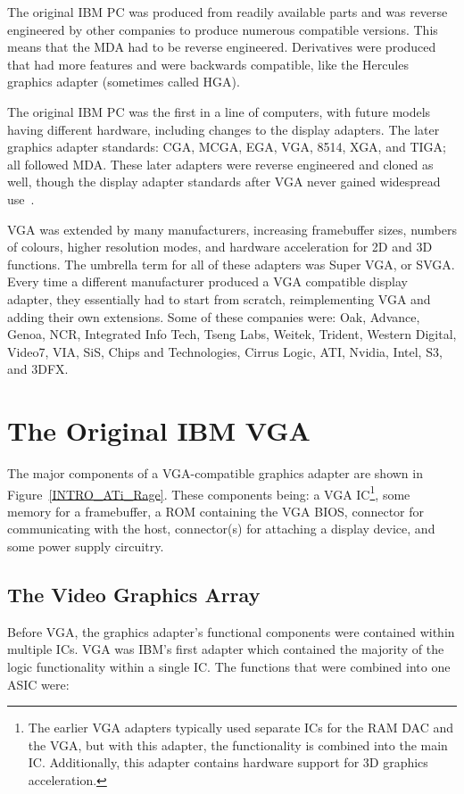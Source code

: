 The original IBM PC was produced from readily available parts and was reverse
engineered by other companies to produce numerous compatible versions. This means
that the MDA had to be reverse engineered. Derivatives were produced that had
more features and were backwards compatible, like the Hercules graphics adapter
(sometimes called HGA).

The original IBM PC was the first in a line of computers, with future models
having different hardware, including changes to the display adapters. The later
graphics adapter standards: CGA, MCGA, EGA, VGA, 8514, XGA, and TIGA; all
followed MDA. These later adapters were reverse engineered and cloned as well,
though the display adapter standards after VGA never gained widespread
use~\cite{VGA_Programmers}.

VGA was extended by many manufacturers, increasing framebuffer sizes, numbers of
colours, higher resolution modes, and hardware acceleration for 2D and 3D
functions. The umbrella term for all of these adapters was Super
VGA, or SVGA. Every time a
different manufacturer produced a VGA compatible display adapter, they
essentially had to start from scratch, reimplementing VGA and adding their own
extensions. Some of these companies were: Oak, Advance, Genoa, NCR, Integrated
Info Tech, Tseng Labs, Weitek, Trident, Western Digital, Video7, VIA, SiS, Chips
and Technologies, Cirrus Logic, ATI, Nvidia, Intel, S3, and 3DFX.


\section{The Original IBM VGA}
The major components of a VGA-compatible graphics adapter are shown in
Figure~\ref{INTRO_ATi_Rage}. These components being: a VGA IC\footnote{The
earlier VGA adapters typically used separate ICs for the RAM DAC and the VGA, but
with this adapter, the functionality is combined into the main IC. Additionally,
this adapter contains hardware support for 3D graphics acceleration.}, some
memory for a framebuffer, a ROM containing the VGA BIOS, connector for
communicating with the host, connector(s) for attaching a display device, and
some power supply circuitry.


\subsection{The Video Graphics Array}
Before VGA, the graphics adapter's functional components were contained within
multiple ICs. VGA was IBM's first adapter which contained the majority of the
logic functionality within a single IC. The functions that were combined
into one ASIC were:

